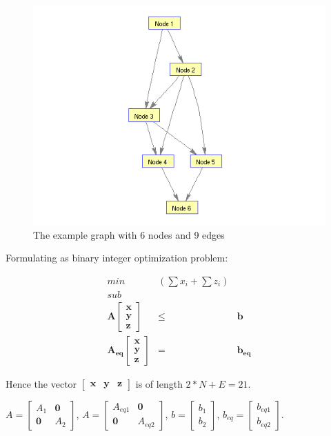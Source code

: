 \documentclass[authoryear,preprint,review,12pt]{elsarticle}
\begin{document}
\begin{figure}[ht]
\includegraphics[scale=0.75]{images/testGraph}\caption{The example graph with 6 nodes and 9 edges}
\end{figure}


Formulating as binary integer optimization problem:

\begin{eqnarray*}
min & (\sum x_{i}+\sum z_{i})\\
sub\\
\mathbf{A}\left[\begin{array}{c}
\mathbf{x}\\
\mathbf{y}\\
\mathbf{z}
\end{array}\right] & \leq & \mathbf{b}\\
\mathbf{A_{eq}}\left[\begin{array}{c}
\mathbf{x}\\
\mathbf{y}\\
\mathbf{z}
\end{array}\right] & = & \mathbf{b_{eq}}
\end{eqnarray*}


Hence the vector $\left[\mathbf{\begin{array}{ccc}
\mathbf{x} & y & z\end{array}}\right]$ is of length $2*N+E=21$.

$A=\left[\begin{array}{cc}
A_{1} & \mathbf{0}\\
\mathbf{0} & A_{2}
\end{array}\right]$, $A=\left[\begin{array}{cc}
A_{eq1} & \mathbf{0}\\
\mathbf{0} & A_{eq2}
\end{array}\right]$, $b=\left[\begin{array}{c}
b_{1}\\
b_{2}
\end{array}\right]$, $b_{eq}=\left[\begin{array}{c}
b_{eq1}\\
b_{eq2}
\end{array}\right]$.\\
\end{document}
